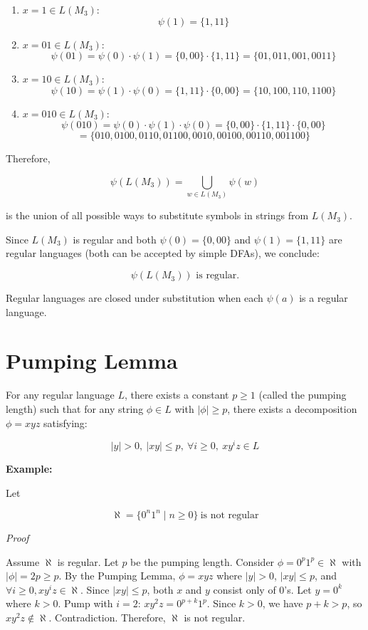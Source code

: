 \documentclass[12pt,a4paper,openany]{article}
\begin{document}
\begin{enumerate}
    \item $x = 1 \in L(M_3)$:
    \[\psi(1) = \{1, 11\}\]
    
    \item $x = 01 \in L(M_3)$:
    \[\psi(01) = \psi(0) \cdot \psi(1) = \{0, 00\} \cdot \{1, 11\} = \{01, 011, 001, 0011\}\]
    
    \item $x = 10 \in L(M_3)$:
    \[\psi(10) = \psi(1) \cdot \psi(0) = \{1, 11\} \cdot \{0, 00\} = \{10, 100, 110, 1100\}\]
    
    \item $x = 010 \in L(M_3)$:
    \[\psi(010) = \psi(0) \cdot \psi(1) \cdot \psi(0) = \{0, 00\} \cdot \{1, 11\} \cdot \{0, 00\}\]
    \[= \{010, 0100, 0110, 01100, 0010, 00100, 00110, 001100\}\]
\end{enumerate}

Therefore,

\[ \psi(L(M_3)) = \bigcup_{w \in L(M_3)} \psi(w) \]

is the union of all possible ways to substitute symbols in strings from $L(M_3)$.

Since $L(M_3)$ is regular and both $\psi(0) = \{0, 00\}$ and $\psi(1) = \{1, 11\}$ are regular languages (both can be accepted by simple DFAs), we conclude:

\[ \psi(L(M_3)) \text{ is regular.} \]

Regular languages are closed under substitution when each $\psi(a)$ is a regular language.

\section{Pumping Lemma}

For any regular language $L$, there exists a constant $p \geq 1$ (called the pumping length) such that for any string $\phi \in L$ with $|\phi| \geq p$, there exists a decomposition $\phi = xyz$ satisfying:

\[|y| > 0, \ |xy| \leq p, \ \forall i \geq 0, \ xy^iz \in L\]


\textbf{Example:}

Let 

\[\aleph = \{0^n 1^n \mid n \geq 0\} \ \text{is not regular}\]

\emph{Proof}

Assume $\aleph$ is regular. Let $p$ be the pumping length. 
Consider $\phi = 0^p 1^p \in \aleph$ with $|\phi| = 2p \geq p$. 
By the Pumping Lemma, $\phi = xyz$ where $|y| > 0$, $|xy| \leq p$, and $\forall i \geq 0, xy^iz \in \aleph$. 
Since $|xy| \leq p$, both $x$ and $y$ consist only of $0$'s. Let $y = 0^k$ where $k > 0$. 
Pump with $i = 2$: $xy^2z = 0^{p+k}1^p$. Since $k > 0$, we have $p + k > p$, so $xy^2z \notin \aleph$. Contradiction. Therefore, $\aleph$ is not regular. 
\end{document}

